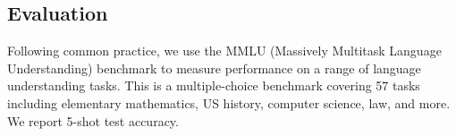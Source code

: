 \subsection{Evaluation}

\begin{table}
\vspace{-1em}
\centering
\caption{MMLU 5-shot test results for different sizes of LLaMA finetuned on the corresponding datasets using QLoRA.}
\label{tbl:mmlu-llama}
\end{table}
Following common practice, we use the MMLU (Massively Multitask Language Understanding) benchmark \citep{hendrycksmeasuring} to measure performance on a range of language understanding tasks. This is a multiple-choice benchmark covering 57 tasks including elementary mathematics, US history, computer science, law, and more. We report 5-shot test accuracy.

